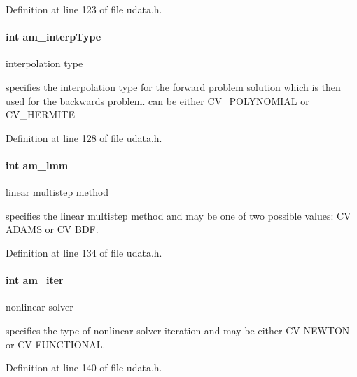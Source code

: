 Definition at line 123 of file udata.\+h.

\hypertarget{struct_user_data_a02adc800558b1cdac3fa8bc96e65dbbb}{}
\paragraph[{am\+\_\+interp\+Type}]{\setlength{\rightskip}{0pt plus 5cm}int am\+\_\+interp\+Type}\label{struct_user_data_a02adc800558b1cdac3fa8bc96e65dbbb}
interpolation type

specifies the interpolation type for the forward problem solution which is then used for the backwards problem. can be either C\+V\+\_\+\+P\+O\+L\+Y\+N\+O\+M\+I\+A\+L or C\+V\+\_\+\+H\+E\+R\+M\+I\+T\+E 

Definition at line 128 of file udata.\+h.

\hypertarget{struct_user_data_a18b6fbc6159783acab9b5f4b106077cd}{}
\paragraph[{am\+\_\+lmm}]{\setlength{\rightskip}{0pt plus 5cm}int am\+\_\+lmm}\label{struct_user_data_a18b6fbc6159783acab9b5f4b106077cd}
linear multistep method

specifies the linear multistep method and may be one of two possible values\+: C\+V A\+D\+A\+M\+S or C\+V B\+D\+F. 

Definition at line 134 of file udata.\+h.

\hypertarget{struct_user_data_a2e0183eade68209e6835d3199054f0cc}{}
\paragraph[{am\+\_\+iter}]{\setlength{\rightskip}{0pt plus 5cm}int am\+\_\+iter}\label{struct_user_data_a2e0183eade68209e6835d3199054f0cc}
nonlinear solver

specifies the type of nonlinear solver iteration and may be either C\+V N\+E\+W\+T\+O\+N or C\+V F\+U\+N\+C\+T\+I\+O\+N\+A\+L. 

Definition at line 140 of file udata.\+h.

\hypertarget{struct_user_data_a7d39c238c319f0164a15744950bfd021}{}
